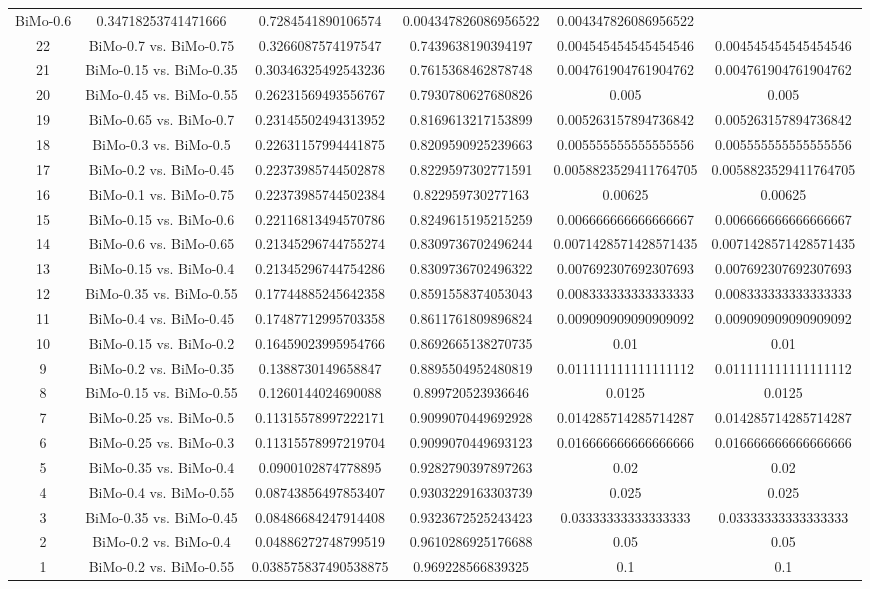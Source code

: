 \documentclass[a4paper,10pt]{article}
\begin{document}
\begin{landscape}
\begin{table}[!htp]
\begin{tabular}{cccccc}
BiMo-0.6&0.34718253741471666&0.7284541890106574&0.004347826086956522&0.004347826086956522\\22&BiMo-0.7 vs. BiMo-0.75&0.3266087574197547&0.7439638190394197&0.004545454545454546&0.004545454545454546\\21&BiMo-0.15 vs. BiMo-0.35&0.30346325492543236&0.7615368462878748&0.004761904761904762&0.004761904761904762\\20&BiMo-0.45 vs. BiMo-0.55&0.26231569493556767&0.7930780627680826&0.005&0.005\\19&BiMo-0.65 vs. BiMo-0.7&0.23145502494313952&0.8169613217153899&0.005263157894736842&0.005263157894736842\\18&BiMo-0.3 vs. BiMo-0.5&0.22631157994441875&0.8209590925239663&0.005555555555555556&0.005555555555555556\\17&BiMo-0.2 vs. BiMo-0.45&0.22373985744502878&0.8229597302771591&0.0058823529411764705&0.0058823529411764705\\16&BiMo-0.1 vs. BiMo-0.75&0.22373985744502384&0.822959730277163&0.00625&0.00625\\15&BiMo-0.15 vs. BiMo-0.6&0.22116813494570786&0.8249615195215259&0.006666666666666667&0.006666666666666667\\14&BiMo-0.6 vs. BiMo-0.65&0.21345296744755274&0.8309736702496244&0.0071428571428571435&0.0071428571428571435\\13&BiMo-0.15 vs. BiMo-0.4&0.21345296744754286&0.8309736702496322&0.007692307692307693&0.007692307692307693\\12&BiMo-0.35 vs. BiMo-0.55&0.17744885245642358&0.8591558374053043&0.008333333333333333&0.008333333333333333\\11&BiMo-0.4 vs. BiMo-0.45&0.17487712995703358&0.8611761809896824&0.009090909090909092&0.009090909090909092\\10&BiMo-0.15 vs. BiMo-0.2&0.16459023995954766&0.8692665138270735&0.01&0.01\\9&BiMo-0.2 vs. BiMo-0.35&0.1388730149658847&0.8895504952480819&0.011111111111111112&0.011111111111111112\\8&BiMo-0.15 vs. BiMo-0.55&0.1260144024690088&0.899720523936646&0.0125&0.0125\\7&BiMo-0.25 vs. BiMo-0.5&0.11315578997222171&0.9099070449692928&0.014285714285714287&0.014285714285714287\\6&BiMo-0.25 vs. BiMo-0.3&0.11315578997219704&0.9099070449693123&0.016666666666666666&0.016666666666666666\\5&BiMo-0.35 vs. BiMo-0.4&0.0900102874778895&0.9282790397897263&0.02&0.02\\4&BiMo-0.4 vs. BiMo-0.55&0.08743856497853407&0.9303229163303739&0.025&0.025\\3&BiMo-0.35 vs. BiMo-0.45&0.08486684247914408&0.9323672525243423&0.03333333333333333&0.03333333333333333\\2&BiMo-0.2 vs. BiMo-0.4&0.04886272748799519&0.9610286925176688&0.05&0.05\\1&BiMo-0.2 vs. BiMo-0.55&0.038575837490538875&0.969228566839325&0.1&0.1\\\hline

\end{tabular}
\end{table}
\end{landscape}
\end{document}
